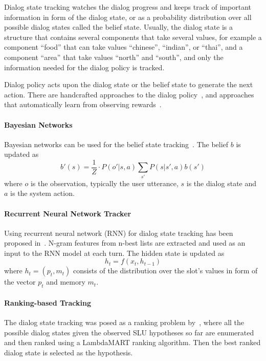 \documentclass[runningheads,a4paper]{llncs}
\begin{document}
Dialog state tracking watches the dialog progress and keeps track of important information in form of the dialog state, or as a probability distribution over all possible dialog states called the belief state. Usually, the dialog state is a structure that contains several components that take several values, for example a component ``food'' that can take values ``chinese'', ``indian'', or ``thai'', and a component ``area'' that take values ``north'' and ``south'', and only the information needed for the dialog policy is tracked.

Dialog policy acts upon the dialog state or the belief state to generate the next action. There are handcrafted approaches to the dialog policy~\cite{pieraccini2005we,skantze2008galatea}, and approaches that automatically learn from observing rewards~\cite{levin2000stochastic,walker2000application,lemon2006isu,thomson2010bayesian}.

\paragraph*{Bayesian Networks}
Bayesian networks can be used for the belief state tracking~\cite{pulman1996conversational,williams2007applying,bui2006tractable,thomson2010bayesian}. The belief $b$ is updated as
\begin{equation}b'(s)=\frac{1}{Z} \cdot P(o'|s,a)\sum_{s'}P(s|s',a)b(s')\end{equation}
where $o$ is the observation, typically the user utterance, $s$ is the dialog state and $a$ is the system action.

\paragraph*{Recurrent Neural Network Tracker}
Using recurrent neural network (RNN) for dialog state tracking has been proposed in~\cite{henderson2014word,henderson2013deep}. N-gram features from n-best lists are extracted and used as an input to the RNN model at each turn. The hidden state is updated as
\begin{equation}h_t=f(x_t, h_{t-1})\end{equation}
where $h_t=(p_t, m_t)$ consists of the distribution over the slot's values in form of the vector $p_t$ and memory $m_t$.

\paragraph*{Ranking-based Tracking}
The dialog state tracking was posed as a ranking problem by~\cite{williams2014web}, where all the possible dialog states given the observed SLU hypotheses so far are enumerated and then ranked using a LambdaMART ranking algorithm. Then the best ranked dialog state is selected as the hypothesis.
\end{document}
